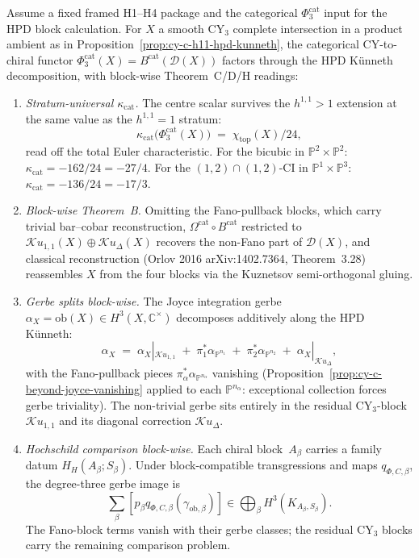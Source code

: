 \begin{theorem}[Fixed-frame \texorpdfstring{$\Phi_3^{\mathrm{cat}}$}{Phi-3-cat} factorisation through HPD Künneth blocks; stratum-universal \texorpdfstring{$\kappa_{\mathrm{cat}} = \chi/24$}{kappa-cat = chi/24}]
\label{thm:cy-c-h11-phi-three-cat-hpd-factor}
Assume a fixed framed H1--H4 package and the categorical
$\Phi_3^{\mathrm{cat}}$ input for the HPD block calculation.
For $X$ a smooth CY$_3$ complete intersection in a product ambient as
in Proposition~\ref{prop:cy-c-h11-hpd-kunneth}, the categorical
CY-to-chiral functor
$\Phi_3^{\mathrm{cat}}(X) = B^{\mathrm{cat}}(\mathcal D(X))$
factors through the HPD Künneth decomposition, with
block-wise Theorem~C/D/H readings:
\begin{enumerate}[label=\textup{(\alph*)}]
 \item \emph{Stratum-universal $\kappa_{\mathrm{cat}}$.} The centre scalar survives
 the $h^{1,1} > 1$ extension at the same value as the
 $h^{1,1} = 1$ stratum:
 \[
 \kappa_{\mathrm{cat}}\bigl(\Phi_3^{\mathrm{cat}}(X)\bigr)
 \;=\;
 \chi_{\mathrm{top}}(X) / 24,
 \]
 read off the total Euler characteristic. For the bicubic in
 $\mathbb P^2 \times \mathbb P^2$:
 $\kappa_{\mathrm{cat}} = -162/24 = -27/4$.
 For the $(1,2) \cap (1,2)$-CI in
 $\mathbb P^1 \times \mathbb P^3$:
 $\kappa_{\mathrm{cat}} = -136/24 = -17/3$.
 \item \emph{Block-wise Theorem~B.} Omitting the Fano-pullback blocks,
 which carry trivial bar--cobar reconstruction,
 $\Omega^{\mathrm{cat}} \circ B^{\mathrm{cat}}$ restricted to
 $\mathcal{K}u_{1,1}(X) \oplus \mathcal{K}u_\Delta(X)$ recovers
 the non-Fano part of $\mathcal D(X)$, and classical
 reconstruction (Orlov 2016 arXiv:1402.7364, Theorem~3.28)
 reassembles $X$ from the four blocks via the Kuznetsov
 semi-orthogonal gluing.
 \item \emph{Gerbe splits block-wise.} The Joyce integration gerbe
 $\alpha_X = \mathrm{ob}(X) \in H^3(X, \mathbb C^\times)$
 decomposes additively along the HPD Künneth:
 \[
 \alpha_X
 \;=\;
 \alpha_X|_{\mathcal{K}u_{1,1}} \;+\;
 \pi_1^*\alpha_{\mathbb P^{n_1}} \;+\;
 \pi_2^*\alpha_{\mathbb P^{n_2}} \;+\;
 \alpha_X|_{\mathcal{K}u_\Delta},
 \]
 with the Fano-pullback pieces
 $\pi_\alpha^*\alpha_{\mathbb P^{n_\alpha}}$ vanishing
 (Proposition~\ref{prop:cy-c-beyond-joyce-vanishing}
 applied to each $\mathbb P^{n_\alpha}$: exceptional collection
 forces gerbe triviality). The non-trivial gerbe sits entirely
 in the residual CY$_3$-block $\mathcal{K}u_{1,1}$ and its
 diagonal correction $\mathcal{K}u_\Delta$.
 \item \emph{Hochschild comparison block-wise.}
 Each chiral block~$A_\beta$ carries a family datum
 $H_H(A_\beta;S_\beta)$.  Under block-compatible transgressions and
 maps $q_{\Phi,C,\beta}$, the degree-three gerbe image is
 \[
  \sum_\beta
  [p_\beta q_{\Phi,C,\beta}(\gamma_{\mathrm{ob},\beta})]
  \in \bigoplus_\beta H^3(K_{A_\beta,S_\beta}).
 \]
 The Fano-block terms vanish with their gerbe classes; the residual
 CY$_3$ blocks carry the remaining comparison problem.
\end{enumerate}
\end{theorem}

